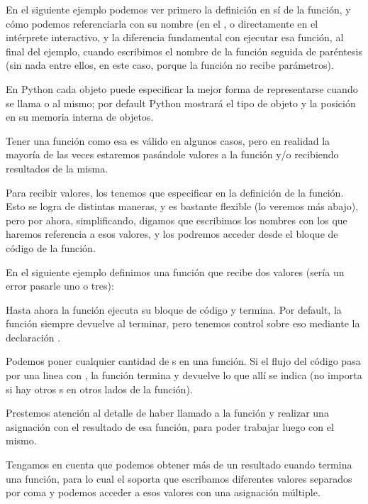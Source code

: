 En el siguiente ejemplo podemos ver primero la definición en sí de la función, y cómo podemos referenciarla con su nombre (en el , o directamente en el intérprete interactivo, y la diferencia fundamental con ejecutar esa función, al final del ejemplo, cuando escribimos el nombre de la función seguida de paréntesis (sin nada entre ellos, en este caso, porque la función no recibe parámetros).


\begin{info}
En Python cada objeto puede especificar la mejor forma de representarse cuando se llama  o  al mismo; por default Python mostrará el tipo de objeto y la posición en su memoria interna de objetos.
\end{info}

Tener una función como esa es válido en algunos casos, pero en realidad la mayoría de las veces estaremos pasándole valores a la función y/o recibiendo resultados de la misma.

Para recibir valores, los tenemos que especificar en la definición de la función. Esto se logra de distintas maneras, y es bastante flexible (lo veremos más abajo), pero por ahora, simplificando, digamos que escribimos los nombres con los que haremos referencia a esos valores, y los podremos acceder desde el bloque de código de la función.

En el siguiente ejemplo definimos una función que recibe dos valores (sería un error pasarle uno o tres):


Hasta ahora la función ejecuta su bloque de código y termina. Por default, la función siempre devuelve  al terminar, pero tenemos control sobre eso mediante la declaración .

Podemos poner cualquier cantidad de s en una función. Si el flujo del código pasa por una linea con , la función termina y devuelve lo que allí se indica (no importa si hay otros s en otros lados de la función).


Prestemos atención al detalle de haber llamado a la función y realizar una asignación con el resultado de esa función, para poder trabajar luego con el mismo.

Tengamos en cuenta que podemos obtener más de un resultado cuando termina una función, para lo cual el  soporta que escribamos diferentes valores separados por coma y podemos acceder a esos valores con una asignación múltiple.

